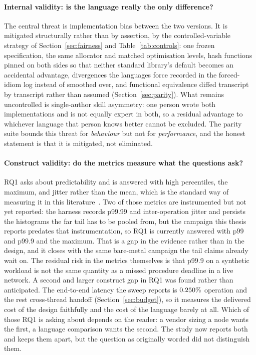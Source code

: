 \documentclass[english,twoside,openright,a4paper,censored,csm,software-track-2020]{HYthesisML}
\begin{document}
\paragraph{Internal validity: is the language really the only difference?}
The central threat is implementation bias between the two versions. It is mitigated
structurally rather than by assertion, by the controlled-variable strategy of
Section~\ref{sec:fairness} and Table~\ref{tab:controls}: one frozen specification, the same
allocator and matched optimisation levels, hash functions pinned on both sides so that neither
standard library's default becomes an accidental advantage, divergences the languages force
recorded in the forced-idiom log instead of smoothed over, and functional equivalence diffed
transcript by transcript rather than assumed (Section~\ref{sec:parity}).
What remains uncontrolled is single-author skill asymmetry: one person wrote both
implementations and is not equally expert in both, so a residual advantage to whichever
language that person knows better cannot be excluded. The parity suite bounds this threat for
\emph{behaviour} but not for \emph{performance}, and the honest statement is that it is
mitigated, not eliminated.

\paragraph{Construct validity: do the metrics measure what the questions ask?}
RQ1 asks about predictability and is answered with high percentiles, the maximum, and jitter
rather than the mean, which is the standard way of measuring it in this
literature~\cite{dean2013tail}. Two of those metrics are instrumented but not yet reported: the
harness records p99.99 and inter-operation jitter and persists the histograms the far tail has
to be pooled from, but the campaign this thesis reports predates that instrumentation, so RQ1 is
currently answered with p99 and p99.9 and the maximum. That is a gap in the evidence rather than
in the design, and it closes with the same bare-metal campaign the tail claims already wait on.
The residual risk in the metrics themselves is that p99.9 on a synthetic workload is not
the same quantity as a missed procedure deadline in a live network. A second and larger
construct gap in RQ1 was found rather than anticipated. The end-to-end latency the sweep reports
is $0.250\%$ operation and the rest cross-thread handoff
(Section~\ref{sec:budget}), so it measures the delivered cost of the design faithfully and the
cost of the language barely at all. Which of those RQ1 is asking about depends on the reader: a
vendor sizing a node wants the first, a language comparison wants the second. The study now
reports both and keeps them apart, but the question as originally worded did not distinguish
them.
\end{document}
